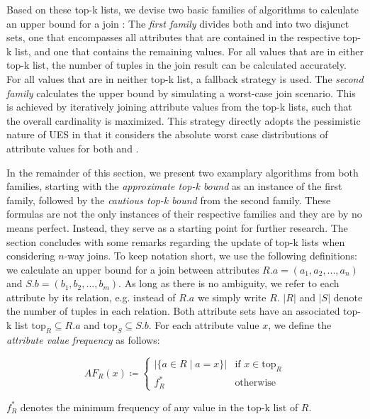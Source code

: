 Based on these top-k lists, we devise two basic families of algorithms to calculate an upper bound for a join : The \emph{first family} divides both  and  into two disjunct sets, one that encompasses all attributes that are contained in the respective top-k list, and one that contains the remaining values. 
For all values that are in either top-k list, the number of tuples in the join result can be calculated accurately. 
For all values that are in neither top-k list, a fallback strategy is used. 
The \emph{second family} calculates the upper bound by simulating a worst-case join scenario. 
This is achieved by iteratively joining attribute values from the top-k lists, such that the overall cardinality is maximized. 
This strategy directly adopts the pessimistic nature of UES in that it considers the absolute worst case distributions of attribute values for both  and .

In the remainder of this section, we present two examplary algorithms from both families, starting with the \emph{approximate top-k bound} as an instance of the first family, followed by the \emph{cautious top-k bound} from the second family. 
These formulas are not the only instances of their respective families and they are by no means perfect. 
Instead, they serve as a starting point for further research. 
The section concludes with some remarks regarding the update of top-k lists when considering $n$-way joins. 
To keep notation short, we use the following definitions: we calculate an upper bound for a join  between attributes $R.a = (a_1, a_2, ..., a_n)$ and $S.b = (b_1, b_2, ..., b_m)$. 
As long as there is no ambiguity, we refer to each attribute by its relation, e.g. instead of $R.a$ we simply write $R$. 
$|R|$ and $|S|$ denote the number of tuples in each relation. 
Both attribute sets have an associated top-k list $\text{top}_R \subseteq R.a$ and $\text{top}_S \subseteq S.b$. 
For each attribute value $x$, we define the \emph{attribute value frequency} as follows:

\begin{equation*}
    AF_R(x) \coloneqq
    \begin{cases}
    |\{a \in R\;|\;a = x\}| & \text{if $x \in \text{top}_R$} \\
    f^\ast_R & \text{otherwise}
    \end{cases}
\end{equation*}

$f^\ast_R$ denotes the minimum frequency of any value in the top-k list of $R$. 

